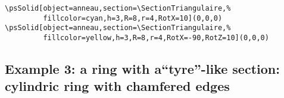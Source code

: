 \begin{verbatim}
\psSolid[object=anneau,section=\SectionTriangulaire,%
         fillcolor=cyan,h=3,R=8,r=4,RotX=10](0,0,0)
\psSolid[object=anneau,section=\SectionTriangulaire,%
         fillcolor=yellow,h=3,R=8,r=4,RotX=-90,RotZ=10](0,0,0)
\end{verbatim}


\newcommand\SectionPneu{
   /m {90 4 div} bind def
   /Scos {m cos 2 m mul cos add 3 m mul cos add} bind def
   /Z0 {h 4 div} bind def
   /c {Z0 Scos div} bind def
   /Z1 {Z0 c m cos mul add} bind def
   /Z2 {Z1 c m 2 mul cos mul add} bind def
   /R1 {R c m sin mul sub} bind def
   /R2 {R1 c m 2 mul sin mul sub} bind def
   /R3 {R2 c m 3 mul sin mul sub} bind def
   R h 4 div neg %
   R h 4 div %
   R1 Z1 %
   R2 Z2 %
   R3 h 2 div %
   r h 2 div  %
   r h 2 div neg  %
   R3 h 2 div neg %
   R2 Z2 neg %
   R1 Z1 neg %
   }

\subsection{Example 3: a ring with a``tyre''-like section: cylindric ring with chamfered edges}

